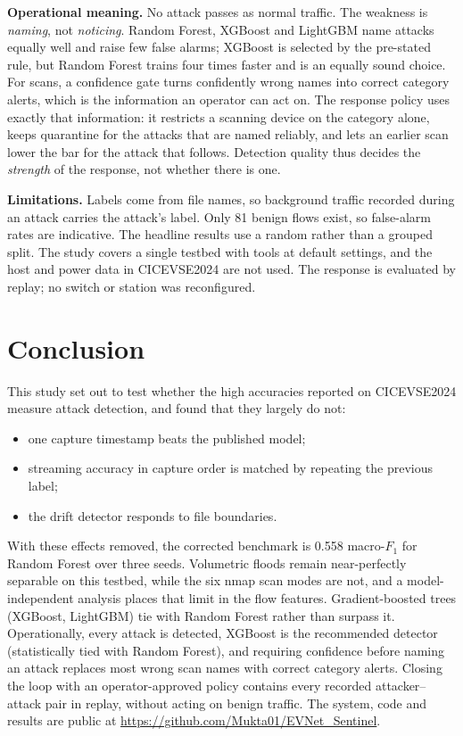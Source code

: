 \documentclass[preprint,12pt]{elsarticle}
\begin{document}
\textbf{Operational meaning.} No attack passes as normal traffic. The weakness is \emph{naming}, not \emph{noticing}. Random Forest, XGBoost and LightGBM name attacks equally well and raise few false alarms; XGBoost is selected by the pre-stated rule, but Random Forest trains four times faster and is an equally sound choice. For scans, a confidence gate turns confidently wrong names into correct category alerts, which is the information an operator can act on. The response policy uses exactly that information: it restricts a scanning device on the category alone, keeps quarantine for the attacks that are named reliably, and lets an earlier scan lower the bar for the attack that follows. Detection quality thus decides the \emph{strength} of the response, not whether there is one.

\textbf{Limitations.} Labels come from file names, so background traffic recorded during an attack carries the attack's label. Only 81 benign flows exist, so false-alarm rates are indicative. The headline results use a random rather than a grouped split. The study covers a single testbed with tools at default settings, and the host and power data in CICEVSE2024 are not used. The response is evaluated by replay; no switch or station was reconfigured.

\section{Conclusion}
\label{sec:conclusion}

This study set out to test whether the high accuracies reported on CICEVSE2024 measure attack detection, and found that they largely do not:
\begin{itemize}
    \item one capture timestamp beats the published model;
    \item streaming accuracy in capture order is matched by repeating the previous label;
    \item the drift detector responds to file boundaries.
\end{itemize}
With these effects removed, the corrected benchmark is 0.558 macro-$F_1$ for Random Forest over three seeds. Volumetric floods remain near-perfectly separable on this testbed, while the six nmap scan modes are not, and a model-independent analysis places that limit in the flow features. Gradient-boosted trees (XGBoost, LightGBM) tie with Random Forest rather than surpass it. Operationally, every attack is detected, XGBoost is the recommended detector (statistically tied with Random Forest), and requiring confidence before naming an attack replaces most wrong scan names with correct category alerts. Closing the loop with an operator-approved policy contains every recorded attacker--attack pair in replay, without acting on benign traffic. The system, code and results are public at \url{https://github.com/Mukta01/EVNet_Sentinel}.
\end{document}
